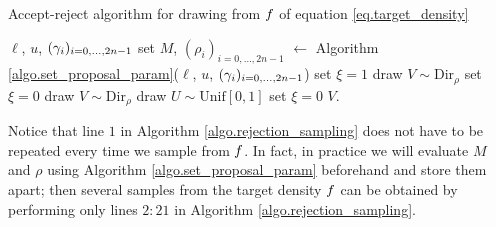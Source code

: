 \documentclass[10pt]{article}
\begin{document}
\begin{algorithm}
 \caption{Accept-reject algorithm for drawing from $f$ of equation \eqref{eq.target_density}}
 \label{algo.rejection_sampling}
 \begin{algorithmic}[5]
  \REQUIRE $\ell$, $u$, $(\gamma_i)_{i=0,\dots,2n-1}$
  \STATE set $M$, $(\rho_i)_{i=0,\dots,2n-1}$ $\leftarrow$ Algorithm \ref{algo.set_proposal_param}($\ell$, $u$, $(\gamma_i)_{i=0,\dots,2n-1}$)
  \STATE set $\xi = 1$
  \STATE draw $V\sim\text{Dir}_{\rho}$
  \STATE set $\xi=0$
  \ENDIF
  \ENDWHILE
  \ELSE
  \STATE draw $V\sim\text{Dir}_{\rho}$
  \STATE draw $U\sim \text{Unif}[0,1]$
  \STATE set $\xi = 0$
  \ENDIF
  \ENDIF
  \ENDWHILE
  \ENDIF
  \RETURN $V$.
 \end{algorithmic}
\end{algorithm}
\begin{remark}
 Notice that line $1$ in Algorithm \ref{algo.rejection_sampling} does not have to be repeated every time we sample from $f$. In fact, in practice we will evaluate  $M$ and $\rho$ using Algorithm \ref{algo.set_proposal_param} beforehand and store them apart; then several samples from the target density $f$ can be obtained by performing only lines $2:21$ in Algorithm \ref{algo.rejection_sampling}.
\end{remark}
\end{document}
